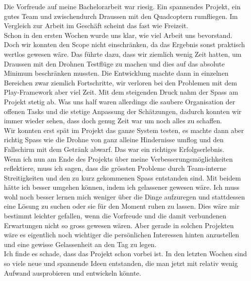 Die Vorfreude auf meine Bachelorarbeit war riesig. Ein spannendes Projekt, ein gutes Team und zwischendurch Draussen mit den Quadcoptern rumfliegen. Im Vergleich zur Arbeit im Geschäft scheint das fast wie Freizeit.\\

Schon in den ersten Wochen wurde uns klar, wie viel Arbeit uns bevorstand. Doch wir konnten den Scope nicht einschränken, da das Ergebnis sonst praktisch wertlos gewesen wäre. Das führte dazu, dass wir ziemlich wenig Zeit hatten, um Draussen mit den Drohnen Testflüge zu machen und dies auf das absolute Minimum beschränken mussten. Die Entwicklung machte dann in einzelnen Bereichen zwar ziemlich Fortschritte, wir verloren bei den Problemen mit dem Play-Framework aber viel Zeit. Mit dem steigenden Druck nahm der Spass am Projekt stetig ab. Was uns half waren allerdings die saubere Organisation der offenen Tasks und die stetige Anpassung der Schätzungen, dadurch konnten wir immer wieder sehen, dass doch genug Zeit war um noch alles zu schaffen.\\

Wir konnten erst spät im Projekt das ganze System testen, es machte dann aber richtig Spass wie die Drohne von ganz alleine Hindernisse umflog und den Fallschirm mit dem Getränk abwarf. Das war ein richtiges Erfolgserlebnis.\\

Wenn ich nun am Ende des Projekts über meine Verbesserungsmöglichkeiten reflektiere, muss ich sagen, dass die grössten Probleme durch Team-interne Streitigkeiten und den zu kurz gekommenen Spass entstanden sind. Mit beidem hätte ich besser umgehen können, indem ich gelassener gewesen wäre. Ich muss wohl noch besser lernen mich weniger über die Dinge aufzuregen und stattdessen eine Lösung zu suchen oder sie für den Moment ruhen zu lassen. Dies wäre mir bestimmt leichter gefallen, wenn die Vorfreude und die damit verbundenen Erwartungen nicht so gross gewesen wären. Aber gerade in solchen Projekten wäre es eigentlich noch wichtiger die persönlichen Interessen hinten anzustellen und eine gewisse Gelassenheit an den Tag zu legen. \\

Ich finde es schade, dass das Projekt schon vorbei ist. In den letzten Wochen sind so viele neue und spannende Ideen entstanden, die man jetzt mit relativ wenig Aufwand ausprobieren und entwickeln könnte.